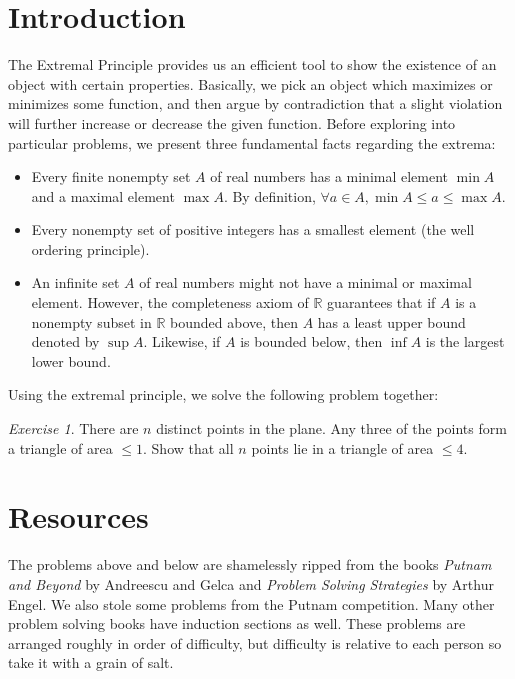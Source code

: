 \documentclass{article}
\theoremstyle{definition}
\theoremstyle{remark}
\newtheorem{exercise}{Exercise}
\begin{document}
\section{Introduction}
The Extremal Principle provides us an efficient tool to show the existence of an object with certain properties. Basically, we pick an object which maximizes or minimizes some function, and then argue by contradiction that a slight violation will further increase or decrease the given function. Before exploring into particular problems, we present three fundamental facts regarding the extrema: 

\begin{itemize}
    \item Every finite nonempty set $A$ of real numbers has a minimal element $\min{A}$ and a maximal element $\max{A}$.
    By definition, $\forall a \in A, \min{A} \leq a \leq \max{A}$. 
    
    \item Every nonempty set of positive integers has a smallest element (the well ordering principle).
    
    \item An infinite set $A$ of real numbers might not have a minimal or maximal element. However, the completeness axiom of $\mathbb{R}$ guarantees that if $A$ is a nonempty subset in $\mathbb{R}$ bounded above, then $A$ has a least upper bound denoted by $\sup{A}$. Likewise, if $A$ is bounded below, then $\inf{A}$ is the largest lower bound. 
\end{itemize}

Using the extremal principle, we solve the following problem together: 

\begin{exercise}
    There are $n$ distinct points in the plane. Any three of the points form a triangle of area $\leq 1$. Show that all $n$ points lie in a triangle of area $\leq 4$. 
\end{exercise}

\section{Resources}

The problems above and below are shamelessly ripped from the books \textit{Putnam and Beyond} by Andreescu and Gelca and \textit{Problem Solving Strategies} by Arthur Engel. We also stole some problems from the Putnam competition. Many other problem solving books have induction sections as well. These problems are arranged roughly in order of difficulty, but difficulty is relative to each person so take it with a grain of salt.
\end{document}
